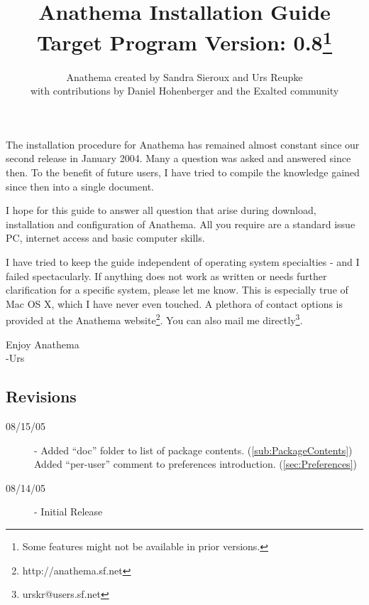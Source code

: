 \documentclass[]{article}
\title{Anathema Installation Guide\\ Target Program Version: 0.8\footnote{Some features might not be available in prior versions.}}
\author{Anathema created by Sandra Sieroux and Urs Reupke\\ with contributions by Daniel Hohenberger and the Exalted community}
\date{}
\begin{document}
\sffamily
\maketitle
\tableofcontents
\bigskip
The installation procedure for Anathema has remained almost constant since our second release in January 2004. Many a question was asked and answered since then. To the benefit of future users, I have tried to compile the knowledge gained since then into a single document. 

I hope for this guide to answer all question that arise during download, installation and configuration of Anathema. All you require are a standard issue PC, internet access and basic computer skills.

I have tried to keep the guide independent of operating system specialties - and I failed spectacularly. If anything does not work as written or needs further clarification for a specific system, please let me know. This is especially true of Mac OS X, which I have never even touched. A plethora of contact options is provided at the Anathema website\footnote{http://anathema.sf.net}. You can also mail me directly\footnote{urskr@users.sf.net}.
\begin{flushright}
Enjoy Anathema\\
	-Urs
\end{flushright}

\begin{appendix}
\section*{Revisions}
\begin{description}
\item[08/15/05] - Added ``doc'' folder to list of package contents. (\ref{sub:PackageContents})\newline
Added ``per-user'' comment to preferences introduction. (\ref{sec:Preferences})
\item[08/14/05] - Initial Release
\end{description}
\end{appendix}
\end{document}
